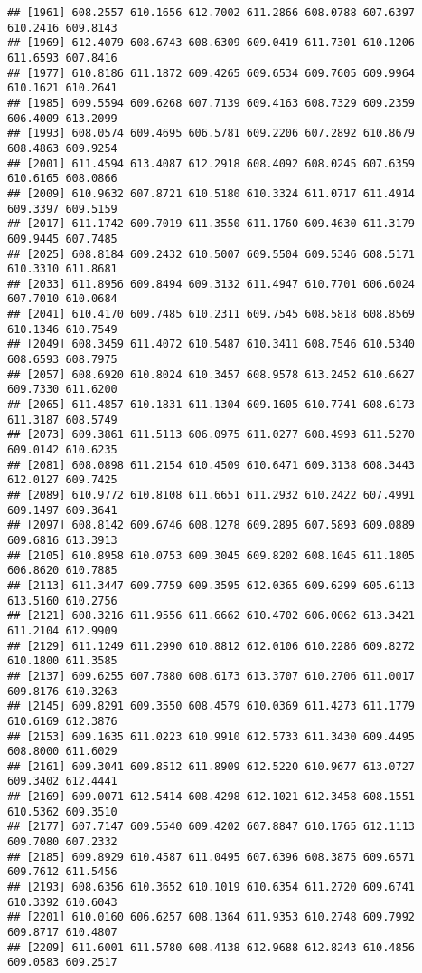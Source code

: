 \documentclass[
]{article}
\begin{document}
\begin{verbatim}
## [1961] 608.2557 610.1656 612.7002 611.2866 608.0788 607.6397 610.2416 609.8143
## [1969] 612.4079 608.6743 608.6309 609.0419 611.7301 610.1206 611.6593 607.8416
## [1977] 610.8186 611.1872 609.4265 609.6534 609.7605 609.9964 610.1621 610.2641
## [1985] 609.5594 609.6268 607.7139 609.4163 608.7329 609.2359 606.4009 613.2099
## [1993] 608.0574 609.4695 606.5781 609.2206 607.2892 610.8679 608.4863 609.9254
## [2001] 611.4594 613.4087 612.2918 608.4092 608.0245 607.6359 610.6165 608.0866
## [2009] 610.9632 607.8721 610.5180 610.3324 611.0717 611.4914 609.3397 609.5159
## [2017] 611.1742 609.7019 611.3550 611.1760 609.4630 611.3179 609.9445 607.7485
## [2025] 608.8184 609.2432 610.5007 609.5504 609.5346 608.5171 610.3310 611.8681
## [2033] 611.8956 609.8494 609.3132 611.4947 610.7701 606.6024 607.7010 610.0684
## [2041] 610.4170 609.7485 610.2311 609.7545 608.5818 608.8569 610.1346 610.7549
## [2049] 608.3459 611.4072 610.5487 610.3411 608.7546 610.5340 608.6593 608.7975
## [2057] 608.6920 610.8024 610.3457 608.9578 613.2452 610.6627 609.7330 611.6200
## [2065] 611.4857 610.1831 611.1304 609.1605 610.7741 608.6173 611.3187 608.5749
## [2073] 609.3861 611.5113 606.0975 611.0277 608.4993 611.5270 609.0142 610.6235
## [2081] 608.0898 611.2154 610.4509 610.6471 609.3138 608.3443 612.0127 609.7425
## [2089] 610.9772 610.8108 611.6651 611.2932 610.2422 607.4991 609.1497 609.3641
## [2097] 608.8142 609.6746 608.1278 609.2895 607.5893 609.0889 609.6816 613.3913
## [2105] 610.8958 610.0753 609.3045 609.8202 608.1045 611.1805 606.8620 610.7885
## [2113] 611.3447 609.7759 609.3595 612.0365 609.6299 605.6113 613.5160 610.2756
## [2121] 608.3216 611.9556 611.6662 610.4702 606.0062 613.3421 611.2104 612.9909
## [2129] 611.1249 611.2990 610.8812 612.0106 610.2286 609.8272 610.1800 611.3585
## [2137] 609.6255 607.7880 608.6173 613.3707 610.2706 611.0017 609.8176 610.3263
## [2145] 609.8291 609.3550 608.4579 610.0369 611.4273 611.1779 610.6169 612.3876
## [2153] 609.1635 611.0223 610.9910 612.5733 611.3430 609.4495 608.8000 611.6029
## [2161] 609.3041 609.8512 611.8909 612.5220 610.9677 613.0727 609.3402 612.4441
## [2169] 609.0071 612.5414 608.4298 612.1021 612.3458 608.1551 610.5362 609.3510
## [2177] 607.7147 609.5540 609.4202 607.8847 610.1765 612.1113 609.7080 607.2332
## [2185] 609.8929 610.4587 611.0495 607.6396 608.3875 609.6571 609.7612 611.5456
## [2193] 608.6356 610.3652 610.1019 610.6354 611.2720 609.6741 610.3392 610.6043
## [2201] 610.0160 606.6257 608.1364 611.9353 610.2748 609.7992 609.8717 610.4807
## [2209] 611.6001 611.5780 608.4138 612.9688 612.8243 610.4856 609.0583 609.2517

\end{verbatim}
\end{document}
